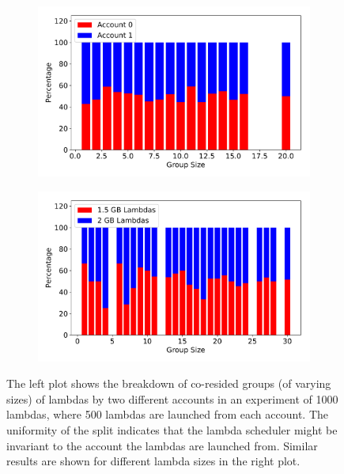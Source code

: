 \begin{figure}[!t]
    \begin{subfigure}{.5\textwidth}
      \centering
      \includegraphics[width=.99\linewidth]{fig/different-accounts.pdf}
    \end{subfigure}%
    \begin{subfigure}{.5\textwidth}
      \centering
      \includegraphics[width=.99\linewidth]{fig/different-sizes.pdf}
    \end{subfigure}

    \caption{The left plot shows the breakdown of co-resided groups (of varying
    sizes) of lambdas by two different accounts in an experiment of 1000
    lambdas, where 500 lambdas are launched from each account. The uniformity of
    the split indicates that the lambda scheduler might be invariant to the
    account the lambdas are launched from. Similar results are shown for
    different lambda sizes in the right plot. }
    \label{fig:factors}
\end{figure}



